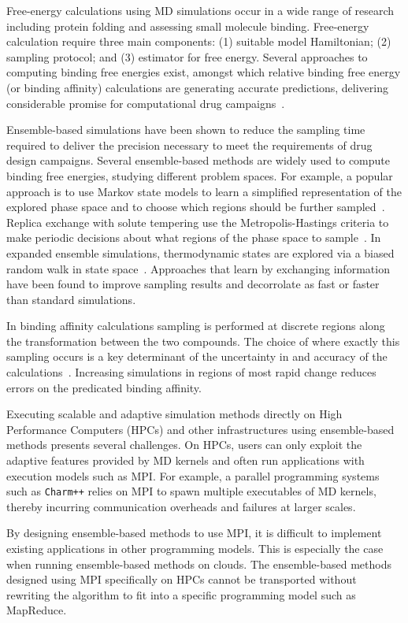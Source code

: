 Free-energy calculations using MD simulations occur in
a wide range of research including protein folding and assessing small molecule 
binding. Free-energy calculation require three main components: 
(1) suitable model Hamiltonian; (2) sampling protocol;
and (3) estimator for free energy. Several approaches to computing binding
free energies exist, amongst which relative binding free energy (or binding
affinity) calculations are generating accurate predictions, delivering
considerable promise for computational drug campaigns~\cite{Karplus2005}.

Ensemble-based simulations have been shown to reduce the sampling time
required to deliver the precision necessary to meet the requirements of drug
design campaigns. Several ensemble-based methods are widely used to compute 
binding free energies, studying different problem spaces. For example, a popular 
approach is to use Markov state models to learn a simplified representation of 
the explored phase space and to choose which regions should be further 
sampled~\cite{Bowman2010}. Replica exchange with solute tempering use the 
Metropolis-Hastings criteria to make periodic decisions about what regions of 
the phase space to sample~\cite{Earl2005,Hritz2008,Kim2012}. In
expanded ensemble simulations, thermodynamic states are explored via a biased
random walk in state space~\cite{Lyubartsev1992}. Approaches that learn by
exchanging information have been found to improve sampling results and
decorrolate as fast or faster than standard simulations.

In binding affinity calculations sampling is performed
at discrete regions along the transformation between the two compounds.
The choice of where exactly this sampling occurs is a key
determinant of the uncertainty in and accuracy of the
calculations~\cite{Ruiter2013, Ruiter2016}. Increasing simulations in regions of 
most rapid change reduces errors on the predicated binding affinity.

Executing scalable and adaptive simulation methods directly on High
Performance Computers (HPCs) and other infrastructures using ensemble-based
methods presents several challenges. On HPCs, users can only exploit the
adaptive features provided by MD kernels and often run applications with
execution models such as MPI. For example, a parallel programming systems
such as \texttt{Charm++} relies on MPI to spawn multiple executables of MD
kernels, thereby incurring communication overheads and failures at larger
scales.

By designing ensemble-based methods to use MPI, it is difficult to implement
existing applications in other programming models. This is especially the
case when running ensemble-based methods on clouds. The ensemble-based
methods designed using MPI specifically on HPCs cannot be transported without
rewriting the algorithm to fit into a specific programming model such as
MapReduce.

